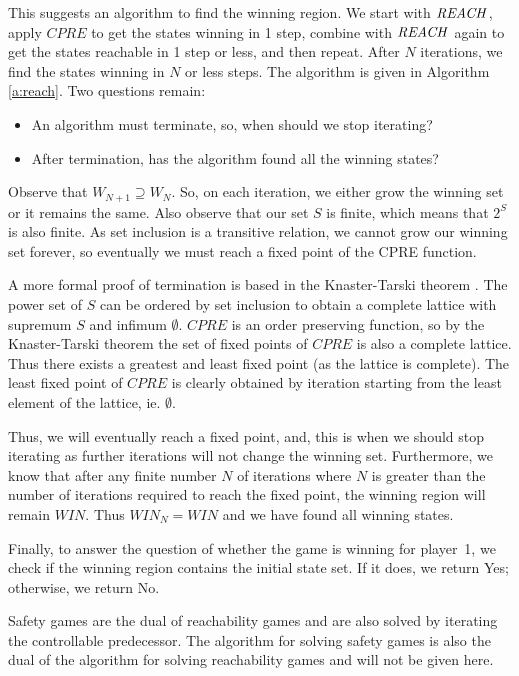 This suggests an algorithm to find the winning region. We start with $\mathit{REACH}$, apply $CPRE$ to get the states winning in 1 step, combine with $\mathit{REACH}$ again to get the states reachable in 1 step or less, and then repeat. After $N$ iterations, we find the states winning in $N$ or less steps. The algorithm is given in Algorithm \ref{a:reach}. Two questions remain: 

\begin{itemize}
    \item An algorithm must terminate, so, when should we stop iterating?
    \item After termination, has the algorithm found all the winning states?
\end{itemize}

Observe that $W_{N+1} \supseteq W_N$. So, on each iteration, we either grow the winning set or it remains the same. Also observe that our set $S$ is finite, which means that $2^S$ is also finite. As set inclusion is a transitive relation, we cannot grow our winning set forever, so eventually we must reach a fixed point of the CPRE function. 

A more formal proof of termination is based in the Knaster-Tarski theorem \cite{knaster_tarski}. The power set of $S$ can be ordered by set inclusion to obtain a complete lattice with supremum $S$ and infimum $\emptyset$. $CPRE$ is an order preserving function, so by the Knaster-Tarski theorem the set of fixed points of $CPRE$ is also a complete lattice. Thus there exists a greatest and least fixed point (as the lattice is complete). The least fixed point of $CPRE$ is clearly obtained by iteration starting from the least element of the lattice, ie. $\emptyset$. 

Thus, we will eventually reach a fixed point, and, this is when we should stop iterating as further iterations will not change the winning set. Furthermore, we know that after any finite number $N$ of iterations where $N$ is greater than the number of iterations required to reach the fixed point, the winning region will remain $WIN$. Thus $WIN_N = WIN$ and we have found all winning states.

Finally, to answer the question of whether the game is winning for player~1, we check if the winning region contains the initial state set. If it does, we return Yes; otherwise, we return No.

Safety games are the dual of reachability games and are also solved by iterating the controllable predecessor. The algorithm for solving safety games is also the dual of the algorithm for solving reachability games and will not be given here.

